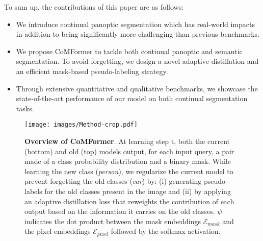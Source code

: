 \documentclass[10pt,twocolumn,letterpaper]{article}
\begin{document}
To sum up, the contributions of this paper are as follows:
\begin{itemize}[noitemsep,topsep=0pt]
\item We introduce continual panoptic segmentation which has real-world impacts in addition to being significantly more challenging than previous benchmarks.
\item We propose CoMFormer to tackle both continual panoptic and semantic segmentation. To avoid forgetting, we design a novel adaptive distillation and an efficient mask-based pseudo-labeling strategy.
\item Through extensive quantitative and qualitative benchmarks, we showcase the state-of-the-art performance of our model on both continual segmentation tasks.
\end{itemize}
\vspace{-0.5em} 
\begin{figure*}[t]
    \texttt{[image: images/Method-crop.pdf]}
    \caption{\textbf{Overview of CoMFormer}. At learning step t, both the current (bottom) and old (top) models output, for each input query, a pair made of a class probability distribution and a binary mask. While learning the new class (\textit{person}), we regularize the current model to prevent forgetting the old classes (\textit{car}) by: (i) generating pseudo-labels for the old classes present in the image and (ii) by applying an adaptive distillation loss that reweights the contribution of each output based on the information it carries on the old classes. $\psi$ indicates the dot product between the mask embeddings $\mathcal{E}_{mask}$ and the pixel embeddings $\mathcal{E}_{pixel}$ followed by the softmax activation.
    }\label{fig:model} \vspace{-1em}
\end{figure*}
\end{document}
